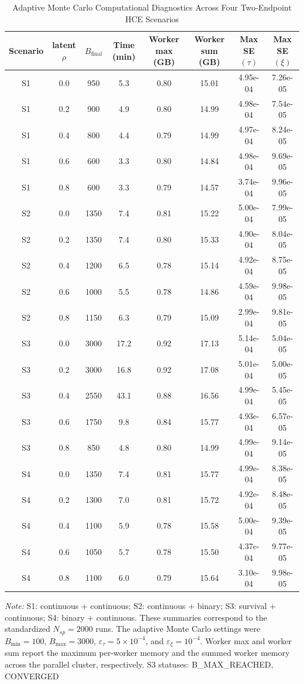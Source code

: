 \begin{table}[ht!]
\centering
\caption{Adaptive Monte Carlo Computational Diagnostics Across Four Two-Endpoint HCE Scenarios}
\label{tab:all_scenarios_computation}
\setlength{\tabcolsep}{4pt}
\begin{tabular}{@{}cccccccc@{}}
\toprule
Scenario & latent $\rho$ & $B_{\text{final}}$ & Time (min) & Worker max (GB) & Worker sum (GB) & Max SE$(\tau)$ & Max SE$(\xi)$ \\
\midrule
S1 & 0.0 & 950 & 5.3 & 0.80 & 15.01 & 4.95e-04 & 7.26e-05 \\
S1 & 0.2 & 900 & 4.9 & 0.80 & 14.99 & 4.98e-04 & 7.54e-05 \\
S1 & 0.4 & 800 & 4.4 & 0.79 & 14.99 & 4.97e-04 & 8.24e-05 \\
S1 & 0.6 & 600 & 3.3 & 0.80 & 14.84 & 4.98e-04 & 9.69e-05 \\
S1 & 0.8 & 600 & 3.3 & 0.79 & 14.57 & 3.74e-04 & 9.96e-05 \\
\addlinespace
S2 & 0.0 & 1350 & 7.4 & 0.81 & 15.22 & 5.00e-04 & 7.99e-05 \\
S2 & 0.2 & 1350 & 7.4 & 0.80 & 15.33 & 4.90e-04 & 8.04e-05 \\
S2 & 0.4 & 1200 & 6.5 & 0.78 & 15.14 & 4.92e-04 & 8.75e-05 \\
S2 & 0.6 & 1000 & 5.5 & 0.78 & 14.86 & 4.59e-04 & 9.98e-05 \\
S2 & 0.8 & 1150 & 6.3 & 0.79 & 15.09 & 2.99e-04 & 9.81e-05 \\
\addlinespace
S3 & 0.0 & 3000 & 17.2 & 0.92 & 17.13 & 5.14e-04 & 5.04e-05 \\
S3 & 0.2 & 3000 & 16.8 & 0.92 & 17.08 & 5.01e-04 & 5.00e-05 \\
S3 & 0.4 & 2550 & 43.1 & 0.88 & 16.56 & 4.99e-04 & 5.45e-05 \\
S3 & 0.6 & 1750 & 9.8 & 0.84 & 15.77 & 4.93e-04 & 6.57e-05 \\
S3 & 0.8 & 850 & 4.8 & 0.80 & 14.99 & 4.99e-04 & 9.14e-05 \\
\addlinespace
S4 & 0.0 & 1350 & 7.4 & 0.81 & 15.77 & 4.99e-04 & 8.38e-05 \\
S4 & 0.2 & 1300 & 7.0 & 0.81 & 15.72 & 4.92e-04 & 8.48e-05 \\
S4 & 0.4 & 1100 & 5.9 & 0.78 & 15.58 & 5.00e-04 & 9.39e-05 \\
S4 & 0.6 & 1050 & 5.7 & 0.78 & 15.50 & 4.37e-04 & 9.77e-05 \\
S4 & 0.8 & 1100 & 6.0 & 0.79 & 15.64 & 3.10e-04 & 9.98e-05 \\
\bottomrule
\end{tabular}
\parbox{0.92\textwidth}{\footnotesize \textit{Note:} S1: continuous + continuous; S2: continuous + binary; S3: survival + continuous; S4: binary + continuous. These summaries correspond to the standardized $N_{sp}=2000$ runs. The adaptive Monte Carlo settings were $B_{\min}=100$, $B_{\max}=3000$, $\varepsilon_{\tau}=5\times 10^{-4}$, and $\varepsilon_{\xi}=10^{-4}$. Worker max and worker sum report the maximum per-worker memory and the summed worker memory across the parallel cluster, respectively. S3 statuses: B_MAX_REACHED, CONVERGED}
\end{table}
